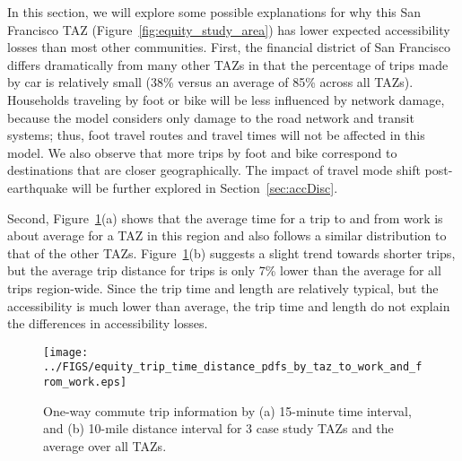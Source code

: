 In this section, we will explore some possible explanations for why this San Francisco TAZ (Figure~\ref{fig:equity_study_area}) has lower expected accessibility losses than most other communities.
First, the financial district of San Francisco differs dramatically from many other TAZs in that the percentage of trips made by car is relatively small (38\% versus an average of 85\% across all TAZs). Households traveling by foot or bike will be less influenced by network damage, because the model considers only damage to the road network and transit systems; thus, foot travel routes and travel times will not be affected in this model. We also observe that more trips by foot and bike correspond to destinations that are closer geographically. The impact of travel mode shift post-earthquake will be further explored in Section~\ref{sec:accDisc}.
 
 Second,  Figure~\ref{fig:time_distance_pdfs}{(a)} shows that the average time for a trip to and from work is about average for a TAZ in this region and also follows a similar distribution to that of the other TAZs. Figure~\ref{fig:time_distance_pdfs}{(b)} suggests a slight trend towards shorter trips, but the average trip distance for trips is only 7\% lower than the average for all trips region-wide. Since the trip time and length are relatively typical, but the accessibility is much lower than average, the trip time and length do not explain the differences in accessibility losses.
 

\begin{figure}
\centering
\texttt{[image: ../FIGS/equity\_trip\_time\_distance\_pdfs\_by\_taz\_to\_work\_and\_from\_work.eps]} 
\caption{One-way commute trip information by (a) 15-minute time interval, and (b) 10-mile distance interval for 3 case study TAZs and the average over all TAZs.}
\label{fig:time_distance_pdfs}
\end{figure}



